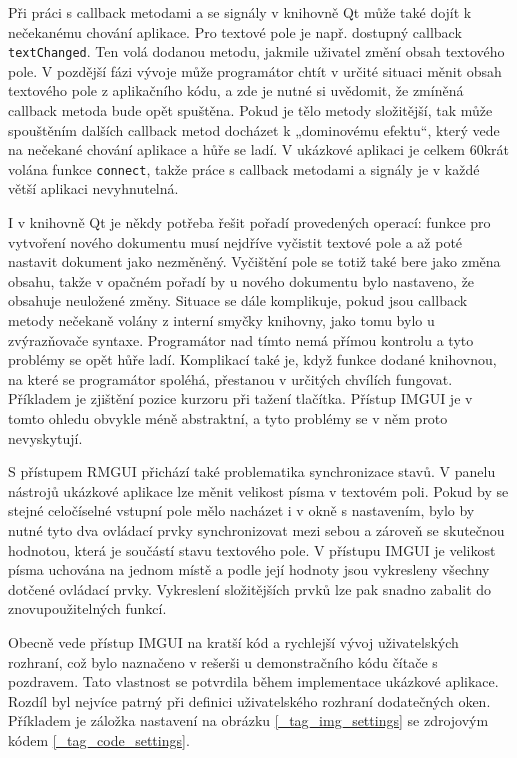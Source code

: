 \documentclass[FM,DP]{tulthesis}
\begin{document}
	Při práci s callback metodami a se signály v knihovně Qt může také dojít k nečekanému chování aplikace. Pro textové pole je např. dostupný callback \texttt{textChanged}. Ten volá dodanou metodu, jakmile uživatel změní obsah textového pole. V pozdější fázi vývoje může programátor chtít v určité situaci měnit obsah textového pole z aplikačního kódu, a zde je nutné si uvědomit, že zmíněná callback metoda bude opět spuštěna. Pokud je tělo metody složitější, tak může spouštěním dalších callback metod docházet k „dominovému efektu“, který vede na nečekané chování aplikace a hůře se ladí. V ukázkové aplikaci je celkem 60krát volána funkce \texttt{connect}, takže práce s callback metodami a signály je v každé větší aplikaci nevyhnutelná.
	
	I v knihovně Qt je někdy potřeba řešit pořadí provedených operací: funkce pro vytvoření nového dokumentu musí nejdříve vyčistit textové pole a až poté nastavit dokument jako nezměněný. Vyčištění pole se totiž také bere jako změna obsahu, takže v opačném pořadí by u nového dokumentu bylo nastaveno, že obsahuje neuložené změny. Situace se dále komplikuje, pokud jsou callback metody nečekaně volány z interní smyčky knihovny, jako tomu bylo u zvýrazňovače syntaxe. Programátor nad tímto nemá přímou kontrolu a tyto problémy se opět hůře ladí. Komplikací také je, když funkce dodané knihovnou, na které se programátor spoléhá, přestanou v určitých chvílích fungovat. Příkladem je zjištění pozice kurzoru při tažení tlačítka. Přístup IMGUI je v tomto ohledu obvykle méně abstraktní, a tyto problémy se v něm proto nevyskytují.
	
	S přístupem RMGUI přichází také problematika synchronizace stavů. V panelu nástrojů ukázkové aplikace lze měnit velikost písma v textovém poli. Pokud by se stejné celočíselné vstupní pole mělo nacházet i v okně s nastavením, bylo by nutné tyto dva ovládací prvky synchronizovat mezi sebou a zároveň se skutečnou hodnotou, která je součástí stavu textového pole. V přístupu IMGUI je velikost písma uchována na jednom místě a podle její hodnoty jsou vykresleny všechny dotčené ovládací prvky. Vykreslení složitějších prvků lze pak snadno zabalit do znovupoužitelných funkcí.	
	
	Obecně vede přístup IMGUI na kratší kód a rychlejší vývoj uživatelských rozhraní, což bylo naznačeno v rešerši u demonstračního kódu čítače s pozdravem. Tato vlastnost se potvrdila během implementace ukázkové aplikace. Rozdíl byl nejvíce patrný při definici uživatelského rozhraní dodatečných oken. Příkladem je záložka nastavení na obrázku \ref{_tag_img_settings} se zdrojovým kódem \ref{_tag_code_settings}.
	
\end{document}
